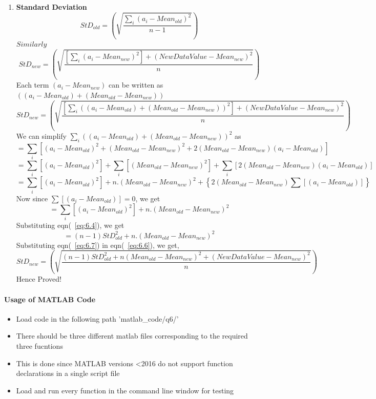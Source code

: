 \documentclass[12pt]{article}
\begin{document}
\begin{enumerate}
\item {\Large\textbf {Standard Deviation}} \newline
\begin{equation} \label{eq:6.4}
StD_{old} = \left(\sqrt{\frac{\sum_{i}(a_i-Mean_{old})^2}{n-1}}\right)
\end{equation}
$Similarly$
\begin{equation}\label{eq:6.5}
StD_{new} = \left(\sqrt{\frac{[\sum_{i}(a_i-Mean_{new})^2]+(NewDataValue-Mean_{new})^2}{n}}\right)
\end{equation}
Each term $(a_i - Mean_{new})$ can be written as $((a_i - Mean_{old}) + (Mean_{old} - Mean_{new}))$
\begin{equation}\label{eq:6.6}
StD_{new} = \left(\sqrt{\frac{[\sum_{i}((a_i - Mean_{old}) + (Mean_{old} - Mean_{new}))^2]+(NewDataValue-Mean_{new})^2}{n}}\right)
\end{equation}
We can simplify $\sum_i((a_i - Mean_{old}) + (Mean_{old} - Mean_{new}))^2$  as
\begin{equation*}
= \sum_i[(a_i - Mean_{old})^2 + (Mean_{old} - Mean_{new})^2 + 2(Mean_{old} - Mean_{new})(a_i - Mean_{old})]
\end{equation*}
\begin{equation*}
= \sum_i[(a_i - Mean_{old})^2] + \sum_i[(Mean_{old} - Mean_{new})^2] + \sum_i[2(Mean_{old} - Mean_{new})(a_i - Mean_{old})]
\end{equation*}
\begin{equation*}
= \sum_i[(a_i - Mean_{old})^2] + n.(Mean_{old} - Mean_{new})^2 + \left\{2(Mean_{old} - Mean_{new})\sum[(a_i - Mean_{old})]\right\}
\end{equation*}
Now since $\sum[(a_i - Mean_{old})] = 0$, we get
\begin{equation*}
= \sum_i[(a_i - Mean_{old})^2] + n.(Mean_{old} - Mean_{new})^2
\end{equation*}
Substituting eqn(~\ref{eq:6.4}), we get
\begin{equation}\label{eq:6.7}
= (n-1)StD_{old}^2 + n.(Mean_{old} - Mean_{new})^2
\end{equation}
Substituting eqn(~\ref{eq:6.7}) in eqn(~\ref{eq:6.6}), we get,
\begin{equation}\label{eq:6.8}
StD_{new} = \left(\sqrt{\frac{(n-1)StD_{old}^2+n(Mean_{old}-Mean_{new})^2+(NewDataValue-Mean_{new})^2}{n}}\right)
\end{equation}
Hence Proved!
\end{enumerate}

\paragraph{Usage of MATLAB Code}
\begin{itemize}
\item Load code in the following path 'matlab\_code/q6/'
\item There should be three different matlab files corresponding to the required three fucntions
\item This is done since MATLAB versions <2016 do not support function declarations in a single script file
\item Load and run every function in the command line window for testing
\end{itemize}
\end{document}
